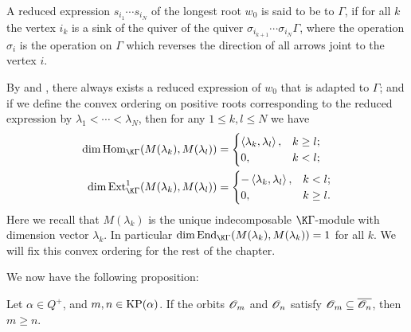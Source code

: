 A reduced expression $s_{i_1}\cdots s_{i_N}$ of the longest
root $w_0$ is said to be  to $\Gamma$, if for all $k$
the vertex $i_k$ is a sink of the quiver of the quiver
$\sigma_{i_{k+1}}\cdots\sigma_{i_N}\Gamma$, where the operation
$\sigma_i$ is the operation on $\Gamma$ which reverses the direction
of all arrows joint to the vertex $i$.

By \cite[Propositions 4.9, 4.12]{L2} and \cite[p59]{Ri},
there always exists a reduced expression of $w_0$
that is adapted to $\Gamma$; and if we define the convex
ordering on positive roots corresponding to the reduced
expression by $\lambda_1<\cdots<\lambda_N$, then for any 
$1\le k,l\le N$ we have 
\[
\begin{aligned}
    \dim\Hom_{\K\Gamma}(M(\lambda_k),M(\lambda_l))& = \begin{cases}
        \<\lambda_k,\lambda_l\>,&k\ge l;\\
        0,&k<l;
    \end{cases}\\
    \dim\Ext^1_{\K\Gamma}(M(\lambda_k),M(\lambda_l))& = \begin{cases}
        -\<\lambda_k,\lambda_l\>,&k<l;\\
        0,&k\ge l.
    \end{cases}
\end{aligned}
\]
Here we recall that $M(\lambda_k)$ is the unique indecomposable $\K\Gamma$-module
with dimension vector $\lambda_k$.
In particular $\dim\End_{\K\Gamma}(M(\lambda_k),M(\lambda_k)) = 1$
for all $k$.
We will fix this convex ordering for the rest of the chapter.

We now have the following proposition:

\begin{proposition}\label{orbit-and-KP}
    Let $\alpha\in Q^+$, and $m,n\in\operatorname{KP}(\alpha)$.
    If the orbits $\mathscr{O}_m$ and $\mathscr{O}_n$ satisfy
    $\mathscr{O}_m\subseteq\overline{\mathscr{O}_n}$, then $m\ge n$.
\end{proposition}

